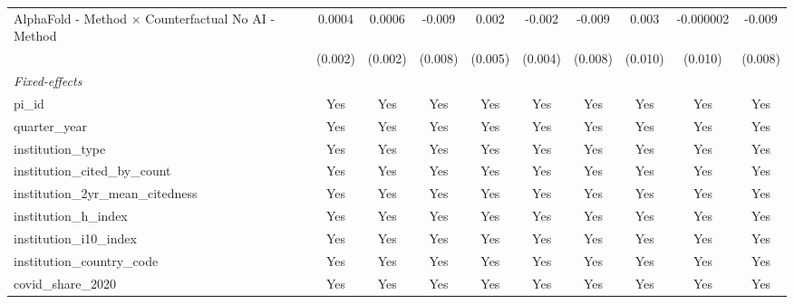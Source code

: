 \begin{tabular}{lccccccccc}
   AlphaFold - Method $\times$ Counterfactual No AI - Method   & 0.0004        & 0.0006        & -0.009        & 0.002          & -0.002        & -0.009        & 0.003   & -0.000002 & -0.009\\   
                                                               & (0.002)       & (0.002)       & (0.008)       & (0.005)        & (0.004)       & (0.008)       & (0.010) & (0.010)   & (0.008)\\   
   \midrule
   \emph{Fixed-effects}\\
   pi\_id                                                      & Yes           & Yes           & Yes           & Yes            & Yes           & Yes           & Yes     & Yes       & Yes\\  
   quarter\_year                                               & Yes           & Yes           & Yes           & Yes            & Yes           & Yes           & Yes     & Yes       & Yes\\  
   institution\_type                                           & Yes           & Yes           & Yes           & Yes            & Yes           & Yes           & Yes     & Yes       & Yes\\  
   institution\_cited\_by\_count                               & Yes           & Yes           & Yes           & Yes            & Yes           & Yes           & Yes     & Yes       & Yes\\  
   institution\_2yr\_mean\_citedness                           & Yes           & Yes           & Yes           & Yes            & Yes           & Yes           & Yes     & Yes       & Yes\\  
   institution\_h\_index                                       & Yes           & Yes           & Yes           & Yes            & Yes           & Yes           & Yes     & Yes       & Yes\\  
   institution\_i10\_index                                     & Yes           & Yes           & Yes           & Yes            & Yes           & Yes           & Yes     & Yes       & Yes\\  
   institution\_country\_code                                  & Yes           & Yes           & Yes           & Yes            & Yes           & Yes           & Yes     & Yes       & Yes\\  
   covid\_share\_2020                                          & Yes           & Yes           & Yes           & Yes            & Yes           & Yes           & Yes     & Yes       & Yes\\  

\end{tabular}
